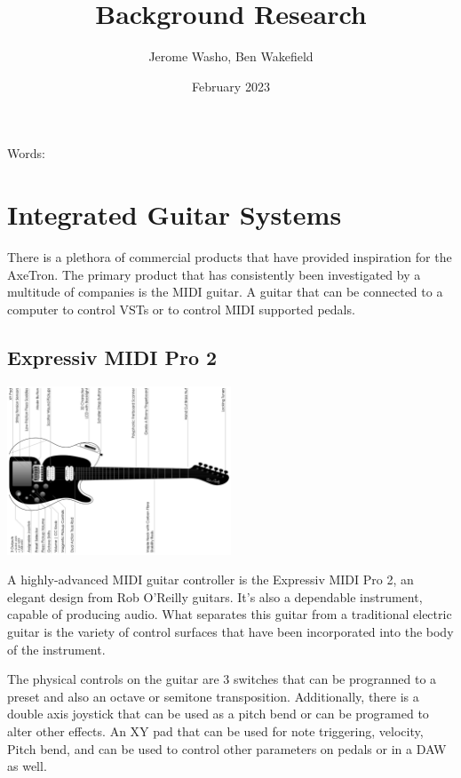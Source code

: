 \documentclass[]{MSword}
\title{Background Research}
\author{Jerome Washo, Ben Wakefield}
\date{February 2023}
\begin{document}
\maketitle
\begin{center}
    Words: \\ %
\end{center}

\section{Integrated Guitar Systems}
\par{There is a plethora of commercial products that have provided inspiration for the AxeTron. The primary product that has consistently been investigated by a multitude of companies is the MIDI guitar. A guitar that can be connected to a computer to control VSTs or to control MIDI supported pedals.}

\subsection*{Expressiv MIDI Pro 2}

\begin{center}
  \includegraphics[width=0.5\textwidth]{img/expressiv.png}
\end{center}

\par{A highly-advanced MIDI guitar controller is the Expressiv MIDI Pro 2\cite{expressivmidi}, an elegant design from Rob O’Reilly guitars. It's also a dependable instrument, capable of producing audio. What separates this guitar from a traditional electric guitar is the variety of control surfaces that have been incorporated into the body of the instrument.}

\par{The physical controls on the guitar are 3 switches that can be progranned to a preset and also an octave or semitone transposition. Additionally, there is a double axis joystick that can be used as a pitch bend or can be programed to alter other effects. An XY pad that can be used for note triggering, velocity, Pitch bend, and can be used to control other parameters on pedals or in a DAW as well.}
\end{document}
